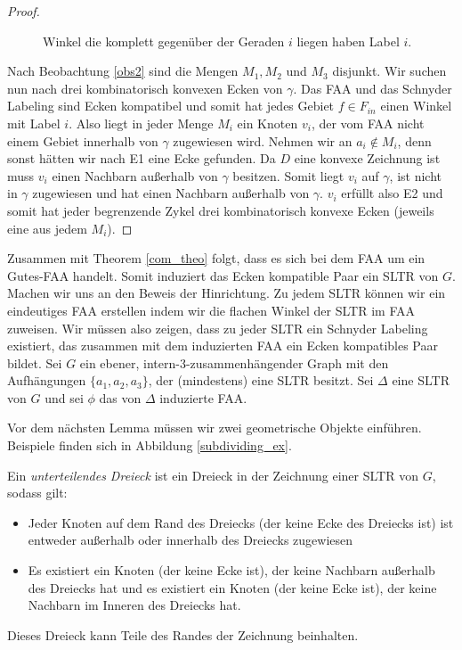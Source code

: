 \begin{proof}
\begin{figure}
\begin{minipage}{0.45\textwidth}
    \caption{Winkel die komplett gegenüber der Geraden $i$ liegen haben Label $i$.}
    \label{sweeplines2}
  \end{minipage}
\end{figure}
\captionsetup{format=plain,labelsep=endash,justification=raggedright,width=1\textwidth}

Nach Beobachtung \ref{obs2} sind die Mengen $M_1,M_2$ und $M_3$ disjunkt. Wir suchen nun nach drei kombinatorisch konvexen Ecken von $\gamma$. Das FAA und das Schnyder Labeling sind Ecken kompatibel und somit hat jedes Gebiet $f \in F_{in}$ einen Winkel mit Label $i$. Also liegt in jeder Menge $M_i$ ein Knoten $v_i$, der vom FAA nicht einem Gebiet innerhalb von $\gamma$ zugewiesen wird. Nehmen wir an $a_i \notin M_i$, denn sonst hätten wir nach E1 eine Ecke gefunden. Da $D$ eine konvexe Zeichnung ist muss $v_i$ einen Nachbarn außerhalb von $\gamma$ besitzen. Somit liegt $v_i$ auf $\gamma$, ist nicht in $\gamma$ zugewiesen und hat einen Nachbarn außerhalb von $\gamma$. $v_i$ erfüllt also E2 und somit hat jeder begrenzende Zykel drei kombinatorisch konvexe Ecken (jeweils eine aus jedem $M_i$).
\end{proof}

Zusammen mit Theorem \ref{com_theo} folgt, dass es sich bei dem FAA um ein Gutes-FAA handelt. Somit induziert das Ecken kompatible Paar ein SLTR von $G$.\\

Machen wir uns an den Beweis der Hinrichtung. Zu jedem SLTR können wir ein eindeutiges FAA erstellen indem wir die flachen Winkel der SLTR im FAA zuweisen. Wir müssen also zeigen, dass zu jeder SLTR ein Schnyder Labeling existiert, das zusammen mit dem induzierten FAA ein Ecken kompatibles Paar bildet. Sei $G$ ein ebener, intern-3-zusammenhängender Graph mit den Aufhängungen $\{a_1,a_2,a_3\}$, der (mindestens) eine SLTR besitzt. Sei $\Delta$ eine SLTR von $G$ und sei $\phi$ das von $\Delta$ induzierte FAA.

Vor dem nächsten Lemma müssen wir zwei geometrische Objekte einführen. Beispiele finden sich in Abbildung \ref{subdividing_ex}.

\begin{definition}
Ein \textit{unterteilendes Dreieck} ist ein Dreieck in der Zeichnung einer SLTR von $G$, sodass gilt:
\begin{itemize}
\item Jeder Knoten auf dem Rand des Dreiecks (der keine Ecke des Dreiecks ist) ist entweder außerhalb oder innerhalb des Dreiecks zugewiesen
\item Es existiert ein Knoten (der keine Ecke ist), der keine Nachbarn außerhalb des Dreiecks hat und es existiert ein Knoten (der keine Ecke ist), der keine Nachbarn im Inneren des Dreiecks hat.
\end{itemize}
Dieses Dreieck kann Teile des Randes der Zeichnung beinhalten.
\end{definition}

